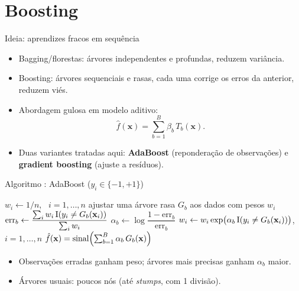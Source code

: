 \section{Boosting}\label{sec:boosting}

\begin{frame}{Ideia: aprendizes fracos em sequência}
\begin{itemize}
  \item Bagging/florestas: árvores \alert{independentes} e profundas, reduzem variância.
  \item Boosting: árvores \alert{sequenciais} e rasas, cada uma corrige os erros da anterior, reduzem viés.
  \item Abordagem \alert{gulosa em modelo aditivo}:
  \[
  \hat f(\mathbf x)=\sum_{b=1}^{B}\beta_b\,T_b(\mathbf x).
  \]
  \item Duas variantes tratadas aqui: \textbf{AdaBoost} (reponderação de observações) e \textbf{gradient boosting} (ajuste a resíduos).
\end{itemize}
\end{frame}

\begin{frame}[t]{Algoritmo \aAda: AdaBoost ($y_i\in\{-1,+1\}$)}
\small
\begin{algorithmic}[1]
\State $w_i\gets1/n$, \ $i=1,\dots,n$
  \State ajustar uma árvore rasa $G_b$ aos dados com pesos $w_i$
  \State $\text{err}_b\gets\dfrac{\sum_i w_i\,\mathrm{I}(y_i\ne G_b(\mathbf x_i))}{\sum_i w_i}$
  \State $\alpha_b\gets\log\dfrac{1-\text{err}_b}{\text{err}_b}$
  \State $w_i\gets w_i\exp\bigl(\alpha_b\,\mathrm{I}(y_i\ne G_b(\mathbf x_i))\bigr)$, \ $i=1,\dots,n$
\EndFor
\State \Return $\hat f(\mathbf x)=\operatorname{sinal}\Bigl(\sum_{b=1}^B\alpha_b\,G_b(\mathbf x)\Bigr)$
\end{algorithmic}
\vspace{6pt}
\begin{itemize}
  \item Observações erradas ganham peso; árvores mais precisas ganham $\alpha_b$ maior.
  \item Árvores usuais: poucos nós (até \emph{stumps}, com 1 divisão).
\end{itemize}
\end{frame}

